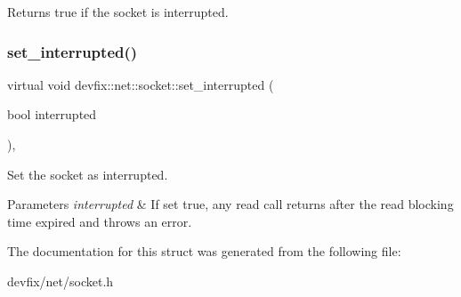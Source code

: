 \begin{DoxyReturn}{Returns}
true if the socket is interrupted. 
\end{DoxyReturn}
\mbox{\label{structdevfix_1_1net_1_1socket_a3fa8d7dcd44e7740b29ad6674005eb5d}} 
\subsubsection{\texorpdfstring{set\+\_\+interrupted()}{set\_interrupted()}}
{\footnotesize\ttfamily virtual void devfix\+::net\+::socket\+::set\+\_\+interrupted (\begin{DoxyParamCaption}\item[{bool}]{interrupted }\end{DoxyParamCaption})\hspace{0.3cm}{\ttfamily [pure virtual]}, {\ttfamily [noexcept]}}

Set the socket as interrupted. 
\begin{DoxyParams}{Parameters}
{\em interrupted} & If set true, any read call returns after the read blocking time expired and throws an error. \\
\hline
\end{DoxyParams}


The documentation for this struct was generated from the following file\+:\begin{DoxyCompactItemize}
\item 
devfix/net/socket.\+h\end{DoxyCompactItemize}
